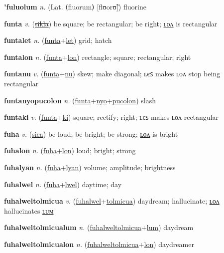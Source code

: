 \textbf{\hypertarget{'fuluolum}{'fuluolum}} \textit{n.} (Lat. ⟨fluorum⟩ [flʊorʊ̃])
fluorine

\textbf{\hypertarget{funta}{funta}} \textit{v.} (\hyperlink{sikla}{\sout{sikla}})
be square; be rectangular; be right; \hyperlink{funtalon}{ʟᴏᴧ} is rectangular

\textbf{\hypertarget{funtalet}{funtalet}} \textit{n.} (\hyperlink{funta}{funta}+\allowbreak \hyperlink{let}{let})
grid; hatch

\textbf{\hypertarget{funtalon}{funtalon}} \textit{n.} (\hyperlink{funta}{funta}+\allowbreak \hyperlink{lon}{lon})
rectangle; square; rectangular; right

\textbf{\hypertarget{funtanu}{funtanu}} \textit{v.} (\hyperlink{funta}{funta}+\allowbreak \hyperlink{nu}{nu})
skew; make diagonal; ʟєꜱ makes ʟᴏᴧ stop being rectangular

\textbf{\hypertarget{funtanyopucolon}{funtanyopucolon}} \textit{n.} (\hyperlink{funta}{funta}+\allowbreak \hyperlink{nyo}{nyo}+\allowbreak \hyperlink{pucolon}{pucolon})
slash

\textbf{\hypertarget{funtaki}{funtaki}} \textit{v.} (\hyperlink{funta}{funta}+\allowbreak \hyperlink{ki}{ki})
square; rectify; right; ʟєꜱ makes ʟᴏᴧ rectangular

\textbf{\hypertarget{fuha}{fuha}} \textit{v.} (\hyperlink{sica}{\sout{sica}})
be loud; be bright; be strong; \hyperlink{fuhalon}{ʟᴏᴧ} is bright

\textbf{\hypertarget{fuhalon}{fuhalon}} \textit{n.} (\hyperlink{fuha}{fuha}+\allowbreak \hyperlink{lon}{lon})
loud; bright; strong

\textbf{\hypertarget{fuhalyan}{fuhalyan}} \textit{n.} (\hyperlink{fuha}{fuha}+\allowbreak \hyperlink{lyan}{lyan})
volume; amplitude; brightness

\textbf{\hypertarget{fuhalwel}{fuhalwel}} \textit{n.} (\hyperlink{fuha}{fuha}+\allowbreak \hyperlink{lwel}{lwel})
daytime; day

\textbf{\hypertarget{fuhalweltolmicua}{fuhalweltolmicua}} \textit{v.} (\hyperlink{fuhalwel}{fuhalwel}+\allowbreak \hyperlink{tolmicua}{tolmicua})
daydream; hallucinate; \hyperlink{fuhalweltolmicualon}{ʟᴏᴧ} hallucinates \hyperlink{fuhalweltolmicualum}{ʟᴜᴍ}

\textbf{\hypertarget{fuhalweltolmicualum}{fuhalweltolmicualum}} \textit{n.} (\hyperlink{fuhalweltolmicua}{fuhalweltolmicua}+\allowbreak \hyperlink{lum}{lum})
daydream

\textbf{\hypertarget{fuhalweltolmicualon}{fuhalweltolmicualon}} \textit{n.} (\hyperlink{fuhalweltolmicua}{fuhalweltolmicua}+\allowbreak \hyperlink{lon}{lon})
daydreamer

